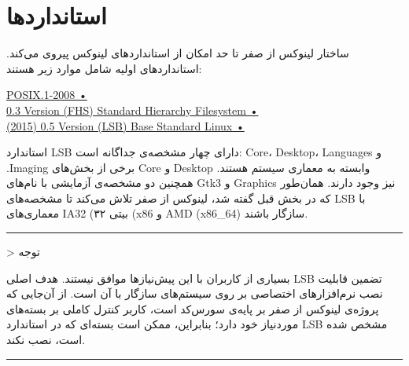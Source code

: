 \documentclass{book}
\begin{document}
\newpage

\section{استانداردها}

ساختار لینوکس از صفر تا حد امکان از استانداردهای لینوکس پیروی می‌کند. استانداردهای اولیه شامل موارد زیر هستند:

\begin{flushleft}


	\href{https://pubs.opengroup.org/onlinepubs/9699919799/}{POSIX.1-2008  •}\\
	\href{https://refspecs.linuxfoundation.org/FHS_3.0/fhs/index.html}{0.3 Version (FHS) Standard Hierarchy Filesystem  •}\\
	\href{https://refspecs.linuxfoundation.org/lsb.shtml}{(2015) 0.5 Version (LSB) Base Standard Linux  •}\\
	
\end{flushleft}

\begin{flushright}

استاندارد LSB دارای چهار مشخصه‌ی جداگانه است: Core، Desktop، Languages و .Imaging برخی از بخش‌های Core و Desktop وابسته به معماری سیستم هستند. همچنین دو مشخصه‌ی آزمایشی با نام‌های Gtk3 و Graphics نیز وجود دارند. همان‌طور که در بخش قبل گفته شد، لینوکس از صفر تلاش می‌کند تا مشخصه‌های LSB با معماری‌های IA32 (۳۲ بیتی (x86 و AMD (x86\_64) سازگار باشند.
	\newline 

\end{flushright}

\hrule

\vspace{15pt}

> توجه
\newline
\par
بسیاری از کاربران با این پیش‌نیازها موافق نیستند. هدف اصلی LSB تضمین قابلیت نصب نرم‌افزارهای اختصاصی بر روی سیستم‌های سازگار با آن است. از آن‌جایی که پروژه‌ی لینوکس از صفر بر پایه‌ی سورس‌کد است، کاربر کنترل کاملی بر بسته‌های موردنیاز خود دارد؛ بنابراین، ممکن است بسته‌ای که در استاندارد LSB مشخص شده است، نصب نکند.

\vspace{15pt}

\hrule

\vspace{15pt}
\end{document}
